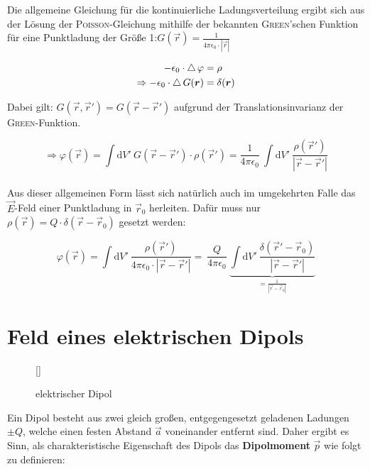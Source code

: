 Die allgemeine Gleichung für die kontinuierliche Ladungsverteilung ergibt sich aus der Lösung der \textsc{Poisson}-Gleichung mithilfe der bekannten \textsc{Green}'schen Funktion für eine Punktladung der Größe 1:\quad $G(\vec{r}) = \frac{1}{4\pi\epsilon_0 \cdot |\vec{r}|}$\

\begin{align*}
-\epsilon_0 \cdot \mathop{{}\bigtriangleup}\nolimits\varphi &= \rho\\
\Rightarrow -\epsilon_0 \cdot \mathop{{}\bigtriangleup}\nolimits G(\bm{r}) &= \delta(\bm{r})\\
\end{align*}

Dabei gilt: $G(\vec{r},\vec{r}') = G(\vec{r}-\vec{r}')$ aufgrund der Translationsinvarianz der \textsc{Green}-Funktion.

\begin{equation*}
\Rightarrow \varphi(\vec{r}) = \int\mathrm{d}V' \ G(\vec{r}-\vec{r}')\cdot\rho(\vec{r}') = \frac{1}{4\pi\epsilon_0} \ \int\mathrm{d}V' \ \frac{\rho(\vec{r}')}{|\vec{r}-\vec{r}'|}
\end{equation*}
\ \\

Aus dieser allgemeinen Form lässt sich natürlich auch im umgekehrten Falle das $\vec{E}$-Feld einer Punktladung in $\vec{r}_0$ herleiten. Dafür muss nur $\rho(\vec{r}) = Q\cdot\delta(\vec{r}-\vec{r}_0)$ gesetzt werden:

\begin{equation*}
\varphi(\vec{r}) = \int\mathrm{d}V' \ \frac{\rho(\vec{r}')}{4\pi\epsilon_0 \cdot |\vec{r}-\vec{r}'|} = \ \frac{Q}{4\pi\epsilon_0} \ \underbrace{\int\mathrm{d}V' \ \frac{\delta(\vec{r}'-\vec{r}_0)}{|\vec{r}-\vec{r}'|}}_{=\frac{1}{|\vec{r}-\vec{r}_0|}}
\end{equation*}

\section{Feld eines elektrischen Dipols}

\begin{wrapfigure}[17]{r}[0cm]{0cm}
	\raisebox{0pt}[\dimexpr{}\baselineskip\relax]{
		\colorbox{hgrey}{
		}
	}
	\caption{elektrischer Dipol}
\end{wrapfigure}
Ein Dipol besteht aus zwei gleich großen, entgegengesetzt geladenen Ladungen $\pm Q $, welche  einen festen Abstand $\vec{a}$ voneinander entfernt sind. Daher ergibt es Sinn, als charakteristische Eigenschaft des Dipols das \textbf{Dipolmoment} $\vec{p}$ wie folgt zu definieren:

